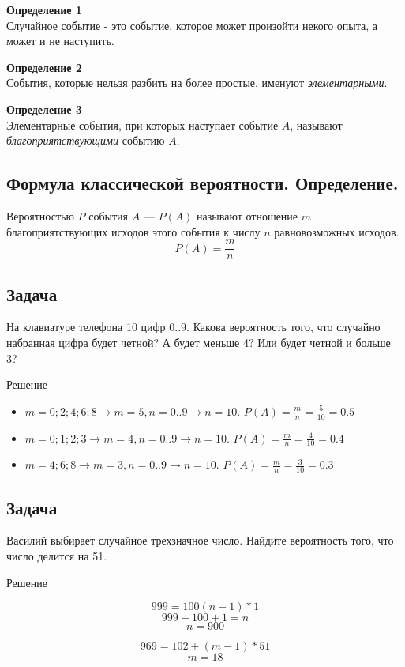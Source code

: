 \documentclass[a4paper,12pt]{extreport}
\begin{document}
\textbf{Определение 1}\\
Случайное событие - это событие, которое может произойти некого опыта, а может и не наступить.

\textbf{Определение 2}\\
События, которые нельзя разбить на более простые, именуют \textit{элементарными}.

\textbf{Определение 3}\\
Элементарные события, при которых наступает событие $A$, называют \textit{благоприятствующими} событию $A$.

\subsection*{Формула классической вероятности. Определение.}
Вероятностью $P$ события $A$ --- $P(A)$ называют отношение $m$ благоприятствующих исходов этого события к числу $n$  равновозможных исходов.
$$P(A)=\frac{m}{n}$$

\subsection{Задача}
На клавиатуре телефона 10 цифр ${0..9}$. Какова вероятность того, что случайно набранная цифра будет четной? А будет меньше 4? Или будет четной и больше 3?
\begin{center}
Решение
\end{center}
\begin{itemize}
	\item $m={0; 2; 4; 6; 8} \longrightarrow m=5, n={0..9} \longrightarrow n=10$. $P(A)=\frac{m}{n}=\frac{5}{10}=0.5$
	\item $m={0; 1; 2; 3} \longrightarrow m=4, n={0..9} \longrightarrow n=10$. $P(A)=\frac{m}{n}=\frac{4}{10}=0.4$
	\item $m={4; 6; 8} \longrightarrow m=3, n={0..9} \longrightarrow n=10$. $P(A)=\frac{m}{n}=\frac{3}{10}=0.3$
\end{itemize}

\subsection{Задача}
Василий выбирает случайное трехзначное число. Найдите вероятность того, что число делится на 51.
\begin{center}
Решение
\end{center}
$$999=100(n-1)*1$$
$$999-100+1=n$$
$$n=900$$

$$969=102+(m-1)*51$$
$$m=18$$
\end{document}
